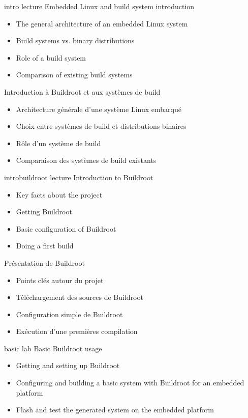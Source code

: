 \def \onsitelecturetimeratio{40}
\def \onsitelabtimeratio{60}


{intro}
{lecture}
{Embedded Linux and build system introduction}
{
  \begin{itemize}
  \item The general architecture of an embedded Linux system
  \item Build systems vs. binary distributions
  \item Role of a build system
  \item Comparison of existing build systems
  \end{itemize}
}
{Introduction à Buildroot et aux systèmes de build}
{
  \begin{itemize}
  \item Architecture générale d'une système Linux embarqué
  \item Choix entre systèmes de build et distributions binaires
  \item Rôle d'un système de build
  \item Comparaison des systèmes de build existants
  \end{itemize}
}
{introbuildroot}
{lecture}
{Introduction to Buildroot}
{
  \begin{itemize}
  \item Key facts about the project
  \item Getting Buildroot
  \item Basic configuration of Buildroot
  \item Doing a first build
  \end{itemize}
}
{Présentation de Buildroot}
{
  \begin{itemize}
  \item Points clés autour du projet
  \item Téléchargement des sources de Buildroot
  \item Configuration simple de Buildroot
  \item Exécution d'une premières compilation
  \end{itemize}
}
{basic}
{lab}
{Basic Buildroot usage}
{
  \begin{itemize}
  \item Getting and setting up Buildroot
  \item Configuring and building a basic system with Buildroot for an
    embedded platform
  \item Flash and test the generated system on the embedded platform
  \end{itemize}
}

